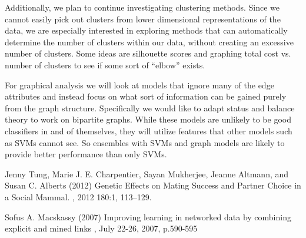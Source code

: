 \documentclass[twoside,twocolumn,paper=letter]{article}
\begin{document}
Additionally, we plan to continue investigating clustering methods. Since we
cannot easily pick out clusters from lower dimensional representations of the
data, we are especially interested in exploring methods that can automatically
determine the number of clusters within our data, without creating an excessive
number of clusters. Some ideas are silhouette scores and graphing total cost vs. number of clusters to see if some sort of ``elbow'' exists.

For graphical analysis we will look at models that ignore many of the edge attributes and instead focus on what sort of information can be gained purely from the graph structure. Specifically we would like to adapt status and balance theory to work on bipartite graphs. While these models are unlikely to be good classifiers in and of themselves, they will utilize features that other models such as SVMs cannot see. So ensembles with SVMs and graph models are likely to provide better performance than only SVMs.


\begin{thebibliography}{99} %

  Jenny Tung, Marie J. E. Charpentier, Sayan Mukherjee, Jeanne Altmann, and Susan C. Alberts (2012)
\newblock 
  Genetic Effects on Mating Success and Partner Choice in a Social Mammal.
, 2012 180:1, 113--129.

Sofus A. Macskassy (2007) 
\newblock
Improving learning in networked data by combining explicit and mined links
, July 22-26, 2007, p.590-595
 
\end{thebibliography}

\end{document}

